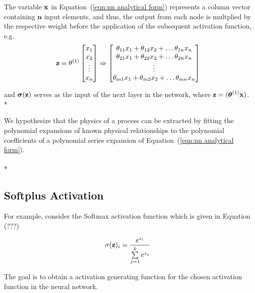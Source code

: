 The variable $\bold x$ in Equation~(\ref{eqn:nn analytical form}) represents a column vector containing $\boldsymbol n$ input elements, and thus, the output from each node is multplied by the respective weight before the application of the subsequent activation function, e.g.
\begin{equation}
	\bold z =
	\theta^{(1)} \begin{bmatrix}
				x_{1} \\
				x_{2} \\
				\vdots \\
				x_{n}
			\end{bmatrix}
	\Rightarrow \begin{bmatrix}
					\theta_{11} x_{1} + \theta_{12} x_{2} + \ldots \theta_{1n} x_{n} \\
					\theta_{21} x_{1} + \theta_{22} x_{2} + \ldots \theta_{2n} x_{n} \\
					\vdots \\
					\theta_{m1} x_{1} + \theta_{m2} x_{2} + \ldots \theta_{mn} x_{n} \\
				\end{bmatrix}
\end{equation}

and $\boldsymbol\sigma (\bold z)$ serves as the input of the next layer in the network, where $\bold z = (\boldsymbol\theta^{(1)} \bold x)$. \\*

We hypothesize that the physics of a process can be extracted by fitting the polynomial expansions of known physical relationships to the polynomial coefficients of a polynomial series expansion of Equation~(\ref{eqn:nn analytical form}). \\
\\*

\subsection{Softplus Activation}

For example, consider the Softmax activation function which is given in Equation (???)

\begin{equation}
	\sigma(\bold z)_i =
	\frac{e^{z_i}}{\sum\limits_{j=1}^k e^{z_j}}
\end{equation}

The goal is to obtain a activation generating function for the chosen activation function in the neural network.

